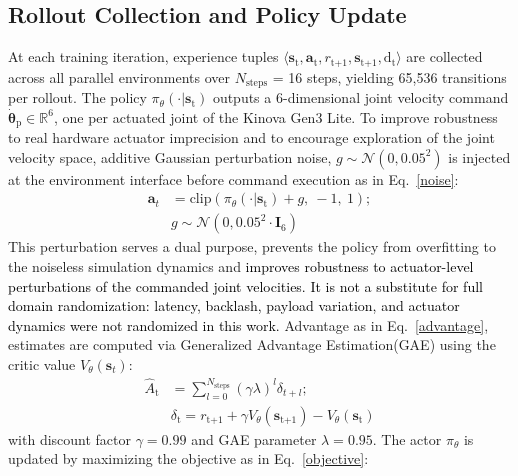 \documentclass[preprint,12pt]{elsarticle}
\begin{document}
\subsection{Rollout Collection and Policy Update}
\label{rollout}
At each training iteration, experience tuples $\langle \mathbf{s}_\text{t}, \mathbf{a}_\text{t}, r_\text{t+1}, \mathbf{s}_\text{t+1}, \text{d}_{\text{t}} \rangle$ are collected across all parallel environments over $N_\text{steps}$ = 16 steps, yielding 65,536 transitions per rollout. The policy $\pi_\theta(\cdot|\mathbf{s}_\text{t})$ outputs a 6-dimensional joint velocity command $\dot{\boldsymbol{\theta}}_\text{p} \in \mathbb{R}^6$, one per actuated joint of the Kinova Gen3 Lite. To improve robustness to real hardware actuator imprecision and to encourage exploration of the joint velocity space, additive Gaussian perturbation noise, $g \sim \mathcal{N}(0, 0.05^2)$ is injected at the environment interface before command execution as in Eq.~\eqref{noise}:  
\begin{equation}
\begin{split}
    \mathbf{a}_t &= \text{clip}\left(\pi_{\theta}(\cdot|\mathbf{s}_\text{t}) + g,\ -1,\ 1\right); \\ 
    & g \sim \mathcal{N}(0, 
    0.05^2\cdot\mathbf{I}_6)
\end{split}
\label{noise}
\end{equation}
This perturbation serves a dual purpose, prevents the policy from overfitting to the noiseless simulation dynamics and \textcolor{black}{improves robustness to actuator-level perturbations of the commanded joint velocities. It is not a substitute for full domain randomization: latency, backlash, payload variation, and actuator dynamics were not randomized in this work.} Advantage as in Eq.~\eqref{advantage}, estimates are computed via Generalized Advantage Estimation(GAE) using the critic value $V_\theta(\mathbf{s}_t)$:
\begin{equation}
\begin{split}
    \hat{A}_\text{t} &= \sum_{l=0}^{N_\text{steps}} (\gamma\lambda)^l \delta_{t+l}; \\
    & \delta_\text{t} = r_\text{t+1} + \gamma V_\theta(\mathbf{s}_\text{t+1}) - V_\theta(\mathbf{s}_\text{t})
\end{split}
\label{advantage}
\end{equation}
with discount factor $\gamma = 0.99$ and GAE parameter $\lambda = 0.95$. The actor $\pi_\theta$
is updated by maximizing the objective as in Eq.~\eqref{objective}:
\end{document}

